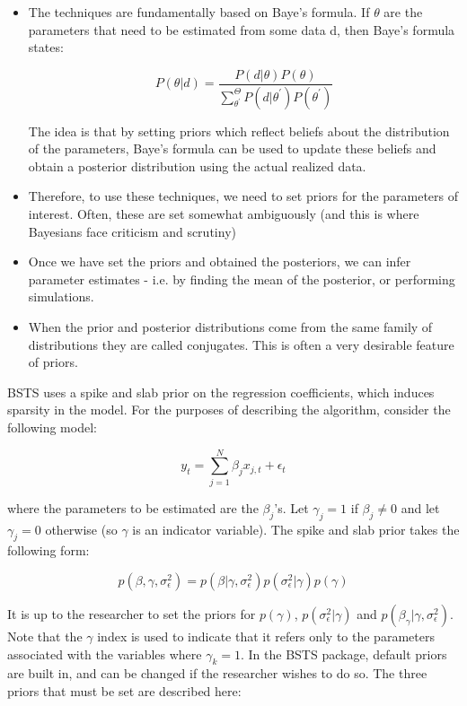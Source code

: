 \documentclass[11pt, oneside]{book}   	%
\begin{document}
\begin{itemize}

\item The techniques are fundamentally based on Baye's formula. If $\theta$ are the parameters that need to be estimated from some data d, then Baye's formula states:

$$ P(\theta | d) = \frac{P(d|\theta)P(\theta)}{\sum_{\theta^{'}}^{\Theta}P(d|\theta^{'})P(\theta^{'})}$$

The idea is that by setting priors which reflect beliefs about the distribution of the parameters, Baye's formula can be used to update these beliefs and obtain a posterior distribution using the actual realized data. 

\item Therefore, to use these techniques, we need to set priors for the parameters of interest. Often, these are set somewhat ambiguously (and this is where Bayesians face criticism and scrutiny)

\item Once we have set the priors and obtained the posteriors, we can infer parameter estimates - i.e. by finding the mean of the posterior, or performing simulations. 

\item When the prior and posterior distributions come from the same family of distributions they are called conjugates. This is often a very desirable feature of priors. 

\end{itemize}


BSTS uses a spike and slab prior on the regression coefficients, which induces sparsity in the model. For the purposes of describing the algorithm, consider the following model:

$$y_{t} = \sum_{j=1}^{N}\beta_{j}x_{j,t} + \epsilon_{t}$$

where the parameters to be estimated are the $\beta_{j}$'s. Let $\gamma_{j} = 1$ if $\beta_{j}\neq 0$ and let $\gamma_{j} = 0$ otherwise (so $\gamma$ is an indicator variable). The spike and slab prior takes the following form:

$$ p(\beta, \gamma, \sigma_{\epsilon}^{2}) = p(\beta | \gamma, \sigma_{\epsilon}^{2})p(\sigma_{\epsilon}^{2}| \gamma) p(\gamma)$$

It is up to the researcher to set the priors for $p(\gamma)$, $p(\sigma_{\epsilon}^{2} | \gamma)$ and $p(\beta_{\gamma} | \gamma, \sigma_{\epsilon}^{2})$. Note that the $\gamma$ index is used to indicate that it refers only to the parameters associated with the variables where $\gamma_{k} = 1$. In the BSTS package, default priors are built in, and can be changed if the researcher wishes to do so. The three priors that must be set are described here:
\end{document}
